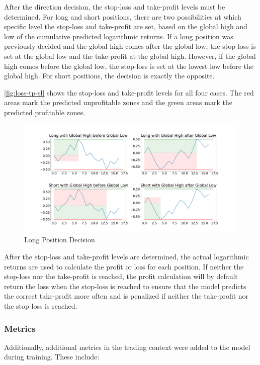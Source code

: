 After the direction decision, the stop-loss and take-profit levels must be determined.
For long and short positions, there are two possibilities at which specific level the stop-loss and take-profit are set, based on the global high and low of the cumulative predicted logarithmic returns.
If a long position was previously decided and the global high comes after the global low, the stop-loss is set at the global low and the take-profit at the global high.
However, if the global high comes before the global low, the stop-loss is set at the lowest low before the global high.
For short positions, the decision is exactly the opposite.

\autoref{fig:loss-tp-sl} shows the stop-loss and take-profit levels for all four cases.
The red areas mark the predicted unprofitable zones and the green areas mark the predicted profitable zones.

\begin{figure}[H]
    \centering
    \includegraphics[width=\textwidth]{images/models/loss_tp_sl}
    \caption{Long Position Decision}
    \label{fig:loss-tp-sl}
\end{figure}

After the stop-loss and take-profit levels are determined, the actual logarithmic returns are used to calculate the profit or loss for each position.
If neither the stop-loss nor the take-profit is reached, the profit calculation will by default return the loss when the stop-loss is reached to ensure that the model predicts the correct take-profit more often and is penalized if neither the take-profit nor the stop-loss is reached.

\subsubsection{Metrics}

Additionally, additional metrics in the trading context were added to the model during training.
These include:

